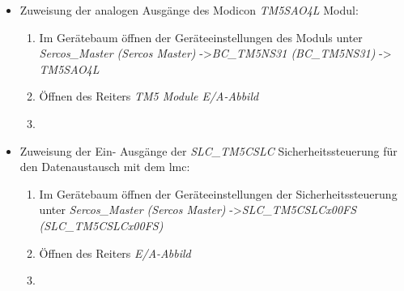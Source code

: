 \documentclass[../../../Bachelorarbeit.tex]{subfiles}
\begin{document}
\begin{itemize}
\begin{enumerate}
\begin{minipage}[t]{\linewidth}
{            }
            \label{fig:my-img30}
        \end{minipage}
    \end{enumerate}
    \item Zuweisung der analogen Ausgänge des Modicon \textit{TM5SAO4L} Modul:
    \begin{enumerate}
        \item Im Gerätebaum öffnen der Geräteeinstellungen des Moduls unter \textit{Sercos\_Master (Sercos Master)} ->\small \textit{BC\_TM5NS31 (BC\_TM5NS31)} -> \textit{TM5SAO4L}
        \item \normalsize Öffnen des Reiters \textit{TM5 Module E/A-Abbild}
        \item \begin{minipage}[t]{\linewidth}
            \raggedright
            \label{fig:my-img31}
        \end{minipage}
    \end{enumerate}
    \item Zuweisung der Ein- \bzw Ausgänge der \textit{SLC\_TM5CSLC} Sicherheitssteuerung für den Datenaustausch mit dem \acs{lmc}:
    \begin{enumerate}
        \item Im Gerätebaum öffnen der Geräteeinstellungen der Sicherheitssteuerung unter \textit{Sercos\_Master (Sercos Master)} ->\small \textit{SLC\_TM5CSLCx00FS (SLC\_TM5CSLCx00FS)}
        \item \normalsize Öffnen des Reiters \textit{E/A-Abbild}
        \item \begin{minipage}[t]{\linewidth}
            \raggedright
\end{minipage}
\end{enumerate}
\end{itemize}
\end{document}
